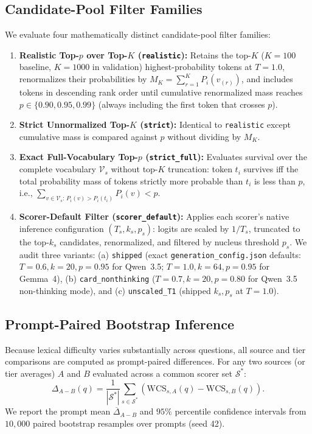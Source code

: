 \documentclass[11pt,a4paper,twocolumn]{article}
\begin{document}
\subsection{Candidate-Pool Filter Families}
We evaluate four mathematically distinct candidate-pool filter families:
\begin{enumerate}
    \item \textbf{Realistic Top-$p$ over Top-$K$ (\texttt{realistic}):} Retains the top-$K$ ($K=100$ baseline, $K=1000$ in validation) highest-probability tokens at $T=1.0$, renormalizes their probabilities by $M_K = \sum_{r=1}^K P_i(v_{(r)})$, and includes tokens in descending rank order until cumulative renormalized mass reaches $p \in \{0.90, 0.95, 0.99\}$ (always including the first token that crosses $p$).
    \item \textbf{Strict Unnormalized Top-$K$ (\texttt{strict}):} Identical to \texttt{realistic} except cumulative mass is compared against $p$ without dividing by $M_K$.
    \item \textbf{Exact Full-Vocabulary Top-$p$ (\texttt{strict\_full}):} Evaluates survival over the complete vocabulary $\mathcal{V}_s$ without top-$K$ truncation: token $t_i$ survives iff the total probability mass of tokens strictly more probable than $t_i$ is less than $p$, i.e., $\sum_{v \in \mathcal{V}_s:\, P_i(v) > P_i(t_i)} P_i(v) < p$.
    \item \textbf{Scorer-Default Filter (\texttt{scorer\_default}):} Applies each scorer's native inference configuration $(T_s, k_s, p_s)$: logits are scaled by $1/T_s$, truncated to the top-$k_s$ candidates, renormalized, and filtered by nucleus threshold $p_s$. We audit three variants: (a) \texttt{shipped} (exact \texttt{generation\_config.json} defaults: $T=0.6, k=20, p=0.95$ for Qwen~3.5; $T=1.0, k=64, p=0.95$ for Gemma~4), (b) \texttt{card\_nonthinking} ($T=0.7, k=20, p=0.80$ for Qwen~3.5 non-thinking mode), and (c) \texttt{unscaled\_T1} (shipped $k_s, p_s$ at $T=1.0$).
\end{enumerate}

\subsection{Prompt-Paired Bootstrap Inference}
Because lexical difficulty varies substantially across questions, all source and tier comparisons are computed as prompt-paired differences. For any two sources (or tier averages) $A$ and $B$ evaluated across a common scorer set $\mathcal{S}^*$:
\begin{equation}
\Delta_{A - B}(q) = \frac{1}{|\mathcal{S}^*|} \sum_{s \in \mathcal{S}^*} \left(\text{WCS}_{s,A}(q) - \text{WCS}_{s,B}(q)\right).
\end{equation}
We report the prompt mean $\overline{\Delta}_{A - B}$ and $95\%$ percentile confidence intervals from $10,000$ paired bootstrap resamples over prompts (seed 42).
\end{document}
